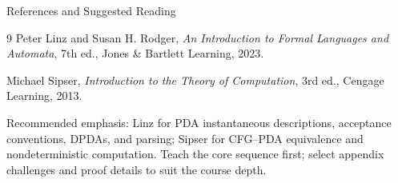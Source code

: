 \documentclass[10pt]{beamer}
\begin{document}
\begin{frame}{References and Suggested Reading}
  \small
  \begin{thebibliography}{9}
      Peter Linz and Susan H. Rodger,
      \newblock \emph{An Introduction to Formal Languages and Automata}, 7th ed.,
      \newblock Jones \& Bartlett Learning, 2023.

      Michael Sipser,
      \newblock \emph{Introduction to the Theory of Computation}, 3rd ed.,
      \newblock Cengage Learning, 2013.
  \end{thebibliography}
  Recommended emphasis: Linz for PDA instantaneous descriptions, acceptance
  conventions, DPDAs, and parsing; Sipser for CFG--PDA equivalence and
  nondeterministic computation. Teach the core sequence first; select
  appendix challenges and proof details to suit the course depth.
\end{frame}
\end{document}
